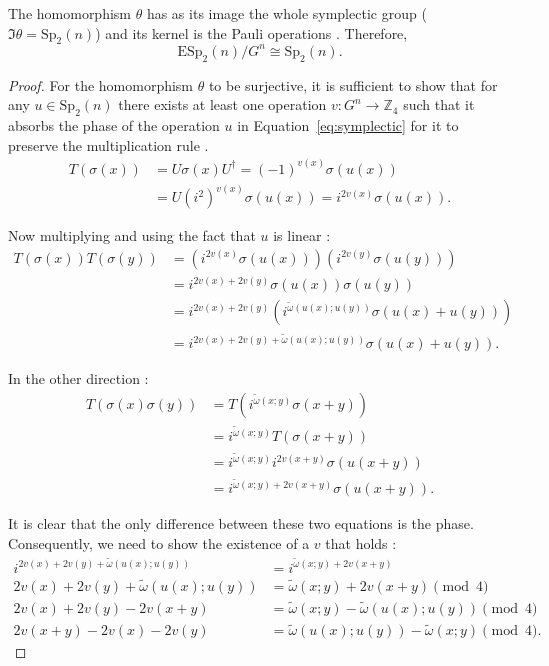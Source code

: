 \begin{theorem}
  The homomorphism $\theta$ has as its image the whole symplectic group ($\Im \theta = \text{Sp}_2(n)$) and its kernel is the Pauli operations \citep{Kitaev2002}. Therefore,
  \begin{equation}
    \text{ESp}_2 (n)/G^n \cong \text{Sp}_2(n)
  .\end{equation}

  \begin{proof}
    
    For the homomorphism $\theta$ to be surjective, it is sufficient to show that for any $u \in \text{Sp}_2(n)$ there exists at least one operation $v : G^n \to \mathbb{Z}_4$ such that it absorbs the phase of the operation $u$ in Equation~\ref{eq:symplectic} for it to preserve the multiplication rule \citep{Cesar2024}.
  \begin{align*}
    T(\sigma(x)) &= U \sigma(x) U^\dagger = (-1)^{v(x)} \sigma(u(x))\\
    &= U (i^2)^{v(x)} \sigma(u(x)) = i^{2v(x)} \sigma(u(x))
  .\end{align*}

    Now multiplying and using the fact that $u$ is linear \citep{Cesar2024}:
  \begin{align*}
    T(\sigma(x))T(\sigma(y)) &= \left(i^{2v(x)} \sigma(u(x))\right)\left(i^{2v(y)} \sigma(u(y))\right)\\
    &= i^{2v(x) + 2v(y)} \sigma(u(x))\sigma(u(y))\\
    &= i^{2v(x) + 2v(y)} \left( i^{\tilde{\omega}(u(x); u(y))} \sigma(u(x) + u(y)) \right)\\
    &= i^{2v(x) + 2v(y) + \tilde{\omega}(u(x); u(y))} \sigma(u(x) + u(y))
  .\end{align*}

    In the other direction \citep{Cesar2024}:
  \begin{align*}
    T(\sigma(x)\sigma(y)) &= T\left(i^{\tilde{\omega}(x; y)} \sigma(x + y)\right)\\
     &= i^{\tilde{\omega}(x; y)} T\left(\sigma(x + y)\right)\\
    &= i^{\tilde{\omega}(x; y)}i^{2 v(x + y)} \sigma(u(x + y))\\
    &= i^{\tilde{\omega}(x; y) + 2 v(x + y)} \sigma(u(x + y))
  .\end{align*}

    It is clear that the only difference between these two equations is the phase. Consequently, we need to show the existence of a $v$ that holds \citep{Cesar2024}:
  \begin{align*}
    i^{2v(x) + 2v(y) + \tilde{\omega}(u(x); u(y))} &= i^{\tilde{\omega}(x; y) + 2 v(x + y)}\\
    2v(x) + 2v(y) + \tilde{\omega}(u(x); u(y)) &= \tilde{\omega}(x; y) + 2 v(x + y) \pmod 4\\
    2v(x) + 2v(y) - 2 v(x + y) &= \tilde{\omega}(x; y) - \tilde{\omega}(u(x); u(y)) \pmod 4\\
    2v(x + y) - 2v(x) - 2v(y) &= \tilde{\omega}(u(x); u(y)) - \tilde{\omega}(x; y) \pmod 4
  .\end{align*}


\end{proof}
\end{theorem}
